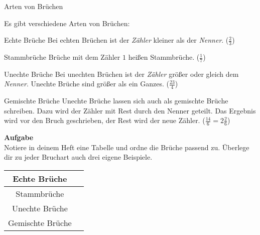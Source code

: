 \documentclass[12pt,a5paper,landscape]{scrartcl}
\begin{document}
	\begin{karte1}{Arten von Brüchen}
		\setlength{\columnseprule}{.5pt}\small
		\begin{multicols}{2}
		Es gibt verschiedene Arten von Brüchen:
		\begin{smalldescription}
			\item[Echte Brüche] Bei echten Brüchen ist der \emph{Zähler} kleiner als der \emph{Nenner}. ($\tfrac{2}{3}$)
			\item[Stammbrüche] Brüche mit dem Zähler $1$ heißen Stammbrüche.
 ($\tfrac{1}{7}$)
 			\item[Unechte Brüche] Bei unechten Brüchen ist der \emph{Zähler} größer oder gleich dem \emph{Nenner}. Unechte Brüche sind größer als ein Ganzes. ($\tfrac{23}{4}$)
			\item[Gemischte Brüche] Unechte Brüche lassen sich auch als gemischte Brüche schreiben. Dazu wird der Zähler mit Rest durch den Nenner geteilt. Das Ergebnis wird vor den Bruch geschrieben, der Rest wird der neue Zähler. ($\tfrac{14}{6} = 2\tfrac{2}{6}$)
		\end{smalldescription}
		
		\columnbreak
		\textbf{Aufgabe}\\
		Notiere in deinem Heft eine Tabelle und ordne die Brüche passend zu. Überlege dir zu jeder Bruchart auch drei eigene Beispiele.
		
		\begin{center}\footnotesize
			\begin{tabular}{c|c}\hline
				Echte Brüche & \hspace{2cm} \\\hline
				Stammbrüche & \\\hline
				Unechte Brüche & \\\hline
				Gemischte Brüche & \\\hline
			\end{tabular}
	
			\normalsize
		\end{center}
		\end{multicols}
	\end{karte1}
	
\end{document}
